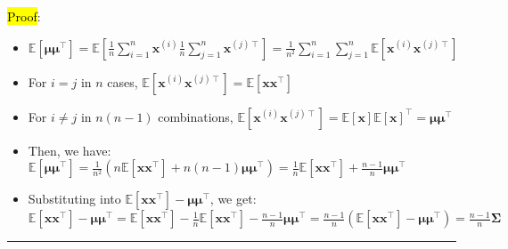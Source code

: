 \begin{itemize}
    \hl{Proof}:
    \begin{itemize}
        \item $\mathbb{E}[\boldsymbol{\mu}\boldsymbol{\mu}^\intercal] = \mathbb{E}\left[\frac{1}{n} \sum_{i=1}^n \boldsymbol{x}^{(i)} \frac{1}{n} \sum_{j=1}^n \boldsymbol{x}^{(j)\intercal}\right] = \frac{1}{n^2} \sum_{i=1}^n \sum_{j=1}^n \mathbb{E}[\boldsymbol{x}^{(i)} \boldsymbol{x}^{(j)\intercal}]$
        \item For $i = j$ in $n$ cases, $\mathbb{E}[\boldsymbol{x}^{(i)} \boldsymbol{x}^{(j)\intercal}] = \mathbb{E}[\boldsymbol{x}\boldsymbol{x}^\intercal]$
        \item For $i \neq j$ in $n(n-1)$ combinations, $\mathbb{E}[\boldsymbol{x}^{(i)} \boldsymbol{x}^{(j)\intercal}] = \mathbb{E}[\boldsymbol{x}] \mathbb{E}[\boldsymbol{x}]^\intercal = \boldsymbol{\mu} \boldsymbol{\mu}^\intercal$
        \item Then, we have: $\mathbb{E}[\boldsymbol{\mu}\boldsymbol{\mu}^\intercal] = \frac{1}{n^2} \left(n \mathbb{E}[\boldsymbol{x}\boldsymbol{x}^\intercal] + n(n-1) \boldsymbol{\mu}\boldsymbol{\mu}^\intercal\right) = \frac{1}{n} \mathbb{E}[\boldsymbol{x}\boldsymbol{x}^\intercal] + \frac{n-1}{n} \boldsymbol{\mu}\boldsymbol{\mu}^\intercal$
        \item Substituting into $\mathbb{E}[\boldsymbol{x}\boldsymbol{x}^\intercal] - \boldsymbol{\mu}\boldsymbol{\mu}^\intercal$, we get: $\mathbb{E}[\boldsymbol{x}\boldsymbol{x}^\intercal] - \boldsymbol{\mu}\boldsymbol{\mu}^\intercal = \mathbb{E}[\boldsymbol{x}\boldsymbol{x}^\intercal] - \frac{1}{n} \mathbb{E}[\boldsymbol{x}\boldsymbol{x}^\intercal] - \frac{n-1}{n} \boldsymbol{\mu}\boldsymbol{\mu}^\intercal = \frac{n-1}{n} \left(\mathbb{E}[\boldsymbol{x}\boldsymbol{x}^\intercal] - \boldsymbol{\mu}\boldsymbol{\mu}^\intercal\right) = \frac{n-1}{n} \boldsymbol{\Sigma}$
    \end{itemize}
\end{itemize}

{\color{lightgray}\hrule height 0.001mm}

